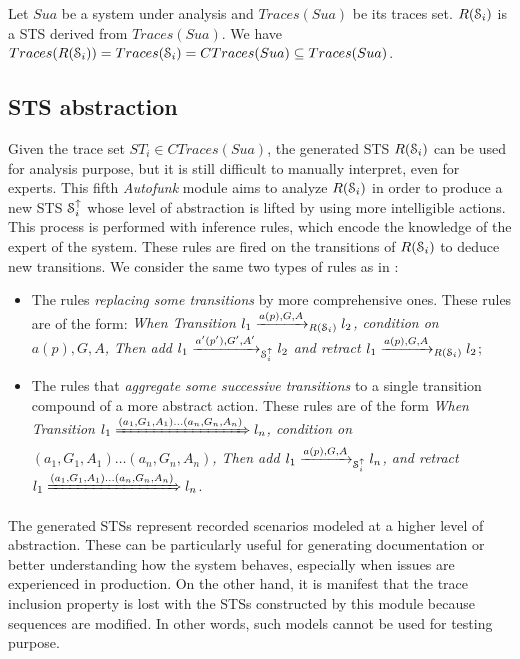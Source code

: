 \begin{proposition}
  Let $\mathit{Sua}$ be a system under analysis and $Traces(Sua)$ be its traces
  set. $R(\EuScript{S}_i)$ is a STS derived from $Traces(Sua)$.
  We have $Traces(R(\EuScript{S}_i)) = Traces(\EuScript{S}_i) =
  CTraces(Sua) \subseteq Traces(Sua)$.
\end{proposition}

\subsection{STS abstraction}

Given the trace set $ST_i \in CTraces(Sua)$, the generated STS
$R(\EuScript{S}_i)$ can be used for analysis purpose, but it is still
difficult to manually interpret, even for experts.  This fifth
\textit{Autofunk} module aims to analyze $R(\EuScript{S}_i)$ in
order to produce a new STS $\EuScript{S}_i^\uparrow$ whose level
of abstraction is lifted by using more intelligible actions. This
process is performed with inference rules, which encode the
knowledge of the expert of the system. These rules are fired on
the transitions of $R(\EuScript{S}_i)$ to deduce new transitions.
We consider the same two types of rules as in
:

\begin{itemize}
    \item The rules \emph{replacing some transitions} by more
    comprehensive ones. These rules are of the form: \textit{When
    Transition $l_1 \xrightarrow{a(p),G,A}_{R(\EuScript{S}_i)}
    l_2$, condition on $a(p),G,A$, Then add $l_1
    \xrightarrow{a'(p'),G',A'}_{\EuScript{S}_i^\uparrow} l_2$ and
    retract $l_1 \xrightarrow{a(p),G,A}_{R(\EuScript{S}_i)}
    l_2$};

    \item The rules that \emph{aggregate some successive transitions}
    to a single transition compound of a more abstract action.
    These rules are of the form \textit{When Transition $l_1
    \xRightarrow{(a_1,G_1,A_1) \dots (a_n,G_n,A_n)} l_n$, condition
    on $(a_1,G_1,A_1) \dots (a_n,G_n,A_n)$, Then add $l_1
    \xrightarrow{a(p),G,A}_{\EuScript{S}_i^\uparrow} l_n $, and
    retract $l_1 \xRightarrow{(a_1,G_1,A_1) \dots (a_n,G_n,A_n)} l_n$}.
\end{itemize}

The generated STSs represent recorded scenarios modeled at a
higher level of abstraction. These can be particularly useful for
generating documentation or better understanding how the system
behaves, especially when issues are experienced in production.
On the other hand, it is manifest that the trace inclusion
property is lost with the STSs constructed by this module because
sequences are modified. In other words, such models cannot be
used for testing purpose.

